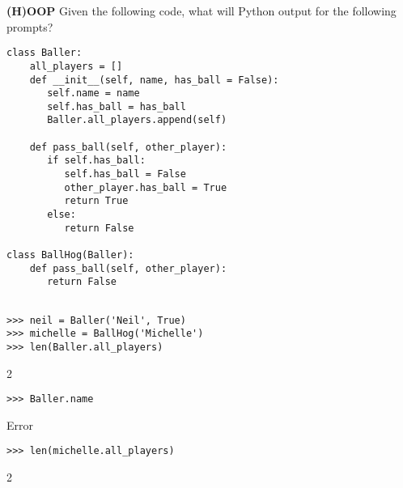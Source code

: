 \begin{blocksection}
\question \textbf{(H)OOP} \newline
Given the following code, what will Python output for the following prompts? 

\begin{lstlisting}
class Baller:
    all_players = []
    def __init__(self, name, has_ball = False):
       self.name = name
       self.has_ball = has_ball
       Baller.all_players.append(self)
    
    def pass_ball(self, other_player):
       if self.has_ball:
          self.has_ball = False
          other_player.has_ball = True
          return True
       else:
          return False

class BallHog(Baller):
    def pass_ball(self, other_player):  
       return False 
       
\end{lstlisting}
\end{blocksection}
\newline
\newline
\newline
\begin{blocksection}

\begin{lstlisting}
>>> neil = Baller('Neil', True)
>>> michelle = BallHog('Michelle')
>>> len(Baller.all_players)
\end{lstlisting}
\begin{solution}[.2in]
2
\end{solution}

\begin{lstlisting}
>>> Baller.name
\end{lstlisting}
\begin{solution}[.2in]
Error
\end{solution}

\begin{lstlisting}
>>> len(michelle.all_players)
\end{lstlisting}
\begin{solution}[.2in]
2
\end{solution}
\end{blocksection}

